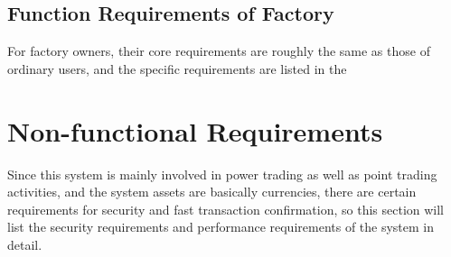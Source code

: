 \subsection{Function Requirements of Factory}
For factory owners, their core requirements are roughly the same as those of ordinary users, and the specific requirements are listed in the 
\begin{table}[!htb]
\caption{Function requirements of factory}
\label{Table:frFact}
\end{table}

\section{Non-functional Requirements}
Since this system is mainly involved in power trading as well as point trading activities, and the system assets are basically currencies, there are certain requirements for security and fast transaction confirmation, so this section will list the security requirements and performance requirements of the system in detail.

